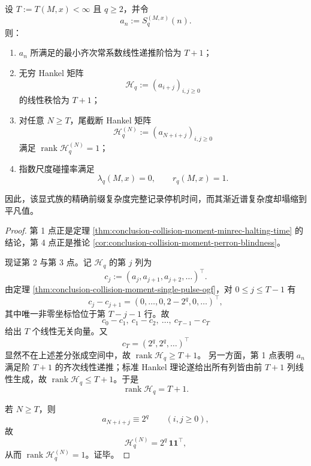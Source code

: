 \begin{theorem}[前缀复杂度与渐近复杂度的严格断裂]\label{thm:conclusion-collision-hankel-prefix-asymptotic-dichotomy}
设 \(T:=T(M,x)<\infty\) 且 \(q\ge 2\)，并令
\[
a_n:=S_q^{(M,x)}(n).
\]
则：
\begin{enumerate}
  \item \(a_n\) 所满足的最小齐次常系数线性递推阶恰为 \(T+1\)；
  \item 无穷 Hankel 矩阵
  \[
  \mathcal H_q:=(a_{i+j})_{i,j\ge 0}
  \]
  的线性秩恰为 \(T+1\)；
  \item 对任意 \(N\ge T\)，尾截断 Hankel 矩阵
  \[
  \mathcal H_q^{(N)}:=(a_{N+i+j})_{i,j\ge 0}
  \]
  满足 \(\operatorname{rank}\mathcal H_q^{(N)}=1\)；
  \item 指数尺度碰撞率满足
  \[
  \lambda_q(M,x)=0,\qquad r_q(M,x)=1.
  \]
\end{enumerate}
因此，该显式族的精确前缀复杂度完整记录停机时间，而其渐近谱复杂度却塌缩到平凡值。
\end{theorem}
\begin{proof}
第 1 点正是定理 \ref{thm:conclusion-collision-moment-minrec-halting-time} 的结论，第 4 点正是推论 \ref{cor:conclusion-collision-moment-perron-blindness}。

现证第 2 与第 3 点。记 \(\mathcal H_q\) 的第 \(j\) 列为
\[
c_j:=(a_j,a_{j+1},a_{j+2},\dots)^\top.
\]
由定理 \ref{thm:conclusion-collision-moment-single-pulse-ogf}，对 \(0\le j\le T-1\) 有
\[
c_j-c_{j+1}
=(0,\dots,0,2-2^q,0,\dots)^\top,
\]
其中唯一非零坐标恰位于第 \(T-j-1\) 行。故
\[
c_0-c_1,\ c_1-c_2,\ \dots,\ c_{T-1}-c_T
\]
给出 \(T\) 个线性无关向量。又
\[
c_T=(2^q,2^q,\dots)^\top
\]
显然不在上述差分张成空间中，故 \(\operatorname{rank}\mathcal H_q\ge T+1\)。
另一方面，第 1 点表明 \(a_n\) 满足阶 \(T+1\) 的齐次线性递推；标准 Hankel 理论遂给出所有列皆由前 \(T+1\) 列线性生成，故 \(\operatorname{rank}\mathcal H_q\le T+1\)。于是
\[
\operatorname{rank}\mathcal H_q=T+1.
\]

若 \(N\ge T\)，则
\[
a_{N+i+j}\equiv 2^q
\qquad(i,j\ge 0),
\]
故
\[
\mathcal H_q^{(N)}=2^q\,\mathbf 1\mathbf 1^\top,
\]
从而 \(\operatorname{rank}\mathcal H_q^{(N)}=1\)。证毕。
\end{proof}

